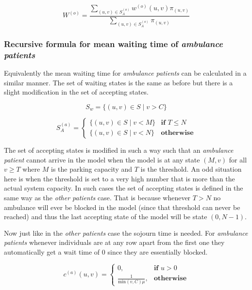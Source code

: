 \begin{equation}
    W^{(o)} = \frac{\sum_{(u,v) \in S_A^{(o)}} w^{(o)}(u,v) \pi_{(u,v)}}{\sum_{(u,v) \in S_A^{(o)}} \pi_{(u,v)}}
\end{equation}



\subsubsection{Recursive formula for mean waiting time of \textit{ambulance patients}}

Equivalently the mean waiting time for \textit{ambulance patients} can be calculated in a similar manner. The set of waiting states is the same as before but there is a slight modification in the set of accepting states.

\[
    S_w = \{(u, v) \in S \; | \; v > C \}    
\]

\begin{equation}\label{accepting_states_ambulance}
    S_A^{(a)}=
    \begin{cases}
        \{(u, v) \in S \; | \; v < M \} & \textbf{if } T \leq N\\
        \{(u, v) \in S \; | \; v < N \} & \textbf{otherwise}
    \end{cases}
\end{equation}

The set of accepting states is modified in such a way such that an \textit{ambulance patient} cannot arrive in the model when the model is at any state \((M, v)\) for all \(v \geq T\) where \(M\) is the parking capacity and \(T\) is the threshold. An odd situation here is when the threshold is set to a very high number that is more than the actual system capacity. In such cases the set of accepting states is defined in the same way as the \textit{other patients} case. That is because whenever \(T > N\) no ambulance will ever be blocked in the model (since that threshold can never be reached) and thus the last accepting state of the model will be state \( (0,N-1)\). 

Now just like in the \textit{other patients} case the sojourn time is needed. For \textit{ambulance patients} whenever individuals are at any row apart from the first one they automatically get a wait time of \(0\) since they are essentially blocked.

\begin{equation} \label{eq:sojourn_ambulance}
    c^{(a)}(u,v) = 
    \begin{cases}
        0, & \textbf{if } u > 0 \\
        \frac{1}{\text{min}(v,C)\mu}, & \textbf{otherwise}
    \end{cases}
\end{equation}

